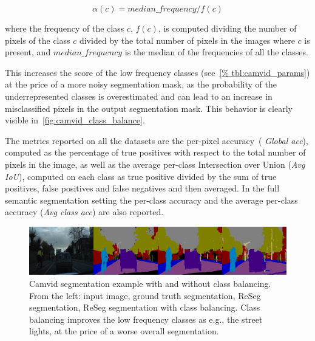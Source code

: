 \begin{equation*}
    \alpha(c) = median\_frequency / f(c)
\end{equation*}

\noindent where the frequency of the class $c$, $f(c)$, is computed dividing
the number of pixels of the class $c$ divided by the total number of pixels in
the images where $c$ is present, and $median\_frequency$ is the median of the
frequencies of all the classes.

This increases the score of the low frequency classes (see~\autoref{%
tbl:camvid_params}) at the price of a more noisy segmentation mask, as the
probability of the underrepresented classes is overestimated and can lead to
an increase in misclassified pixels in the output segmentation mask. This
behavior is clearly visible in~\autoref{fig:camvid_class_balance}.

The metrics reported on all the datasets are the per-pixel accuracy~(\emph{%
Global acc}), computed as the percentage of true positives with respect to the
total number of pixels in the image, as well as the average per-class
Intersection over Union (\emph{Avg IoU}), computed on each class as true
positive divided by the sum of true positives, false positives and false
negatives and then averaged. In the full semantic segmentation setting the
per-class accuracy and the average per-class accuracy (\emph{Avg class acc})
are also reported.

\begin{figure}[t]
    \centering
    \includegraphics[width=\textwidth]{img/reseg/samples/camvid_classbal_diff.png}
    \caption{Camvid segmentation example with and without class balancing. From
        the left: input image, ground truth segmentation, ReSeg segmentation,
        ReSeg segmentation with class balancing. Class balancing improves the
        low frequency classes as e.g., the street lights, at the price of a
        worse overall segmentation.}
    \label{fig:camvid_class_balance}
\end{figure}

